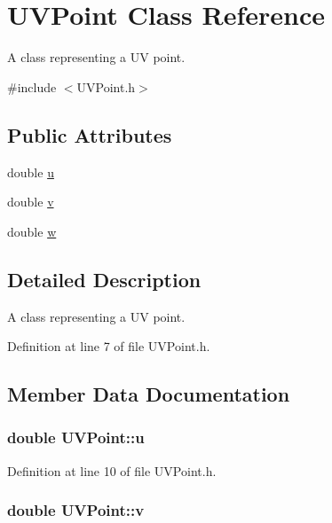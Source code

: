 \hypertarget{classUVPoint}{
\section{UVPoint Class Reference}
\label{classUVPoint}
}


A class representing a UV point.  




{\ttfamily \#include $<$UVPoint.h$>$}

\subsection*{Public Attributes}
\begin{DoxyCompactItemize}
\item 
double \hyperlink{classUVPoint_ad017e2e33a7bf007683bded4bd02a189}{u}
\item 
double \hyperlink{classUVPoint_ac9cf80c29ba32d3c86209f9794e347fc}{v}
\item 
double \hyperlink{classUVPoint_a35c7463cf7ad4605f19808f3110f41e8}{w}
\end{DoxyCompactItemize}


\subsection{Detailed Description}
A class representing a UV point. 

Definition at line 7 of file UVPoint.h.



\subsection{Member Data Documentation}
\hypertarget{classUVPoint_ad017e2e33a7bf007683bded4bd02a189}{
\subsubsection[{u}]{\setlength{\rightskip}{0pt plus 5cm}double {\bf UVPoint::u}}}
\label{classUVPoint_ad017e2e33a7bf007683bded4bd02a189}


Definition at line 10 of file UVPoint.h.

\hypertarget{classUVPoint_ac9cf80c29ba32d3c86209f9794e347fc}{
\subsubsection[{v}]{\setlength{\rightskip}{0pt plus 5cm}double {\bf UVPoint::v}}}
\label{classUVPoint_ac9cf80c29ba32d3c86209f9794e347fc}


